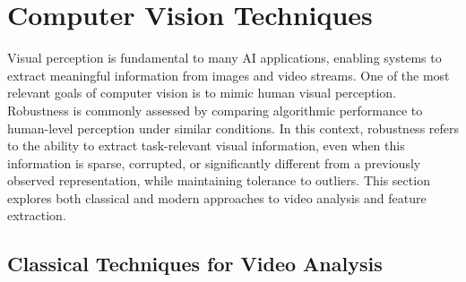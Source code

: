 \documentclass[12pt,a4paper]{report}
\begin{document}
\section{Computer Vision Techniques}
Visual perception is fundamental to many AI applications, enabling systems to extract meaningful information from images and video streams. One of the most relevant goals of computer vision is to mimic human visual perception. Robustness is commonly assessed by comparing algorithmic performance to human-level perception under similar conditions. In this context, robustness refers to the ability to extract task-relevant visual information, even when this information is sparse, corrupted, or significantly different from a previously observed representation, while maintaining tolerance to outliers.
This section explores both classical and modern approaches to video analysis and feature extraction.


\subsection{Classical Techniques for Video Analysis}
\end{document}

